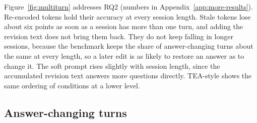 \documentclass[11pt]{article}
\begin{document}
Figure~\ref{fig:multiturn} addresses RQ2 (numbers in Appendix~\ref{app:more-results}).
Re-encoded tokens hold their accuracy at every session length.
Stale tokens lose about six points as soon as a session has more than one turn, and adding the revision text does not bring them back.
They do not keep falling in longer sessions, because the benchmark keeps the share of answer-changing turns about the same at every length, so a later edit is as likely to restore an answer as to change it.
The soft prompt rises slightly with session length, since the accumulated revision text answers more questions directly.
TEA-style shows the same ordering of conditions at a lower level.

\subsection{Answer-changing turns}
\label{sec:changing}

\begin{table}[t]
\centering
\small
{}
\caption{Test accuracy (\%) on answer-changing turns (1{,}622), unchanged turns (2{,}833), and answer-changing turns whose question names no edited station (359). The last two rows are references that run no model. Every reader and condition is in Appendix~\ref{app:edit}.}
\label{tab:changing}
\end{table}
\end{document}
